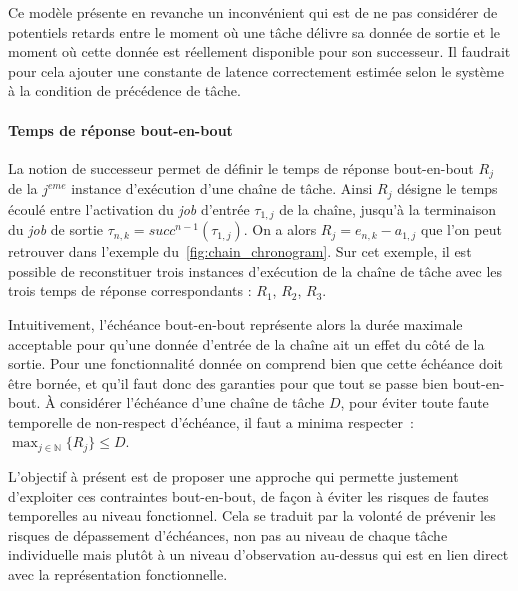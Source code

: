 \documentclass[french, a4paper, 11pt, twoside, pdftex]{StyleThese}
\begin{document}
  		Ce modèle présente en revanche un inconvénient qui est de ne pas considérer de potentiels retards entre le moment où une tâche délivre sa donnée de sortie et le moment où cette donnée est réellement disponible pour son successeur. Il faudrait pour cela ajouter une constante de latence correctement estimée selon le système à la condition de précédence de tâche.


        \paragraph{Temps de réponse bout-en-bout}

    La notion de successeur permet de définir le temps de réponse bout-en-bout $R_j$ de la $ j^{eme} $ instance d'exécution d'une chaîne de tâche. Ainsi $ R_j $ désigne le temps écoulé entre l'activation du \textit{job} d'entrée $\tau_{1, j}$ de la chaîne, jusqu'à la terminaison du \textit{job} de sortie $\tau_{n, k} = succ^{n-1}(\tau_{1, j})$.
    On a alors $R_{j} = e_{n,k} - a_{1,j}$ que l'on peut retrouver dans l'exemple du~\autoref{fig:chain_chronogram}. Sur cet exemple, il est possible de reconstituer trois instances d'exécution de la chaîne de tâche avec les trois temps de réponse correspondants : $R_1$, $R_2$, $R_3$. 
    
	Intuitivement, l'échéance bout-en-bout représente alors la durée maximale acceptable pour qu'une donnée d'entrée de la chaîne ait un effet du côté de la sortie. Pour une fonctionnalité donnée on comprend bien que cette échéance doit être bornée, et qu'il faut donc des garanties pour que tout se passe bien bout-en-bout. À considérer l'échéance d'une chaîne de tâche $D$, pour éviter toute faute temporelle de non-respect d'échéance, il faut a minima respecter~:  $\max_{j \in \mathbb{N}}\{R_j\} \leq D$.
	
	\smallbreak 
	
	L'objectif à présent est de proposer une approche qui permette justement d'exploiter ces contraintes bout-en-bout, de façon à éviter les risques de fautes temporelles au niveau fonctionnel. Cela se traduit par la volonté de prévenir les risques de dépassement d'échéances, non pas au niveau de chaque tâche individuelle mais plutôt à un niveau d'observation au-dessus qui est en lien direct avec la représentation fonctionnelle.
	
\end{document}
